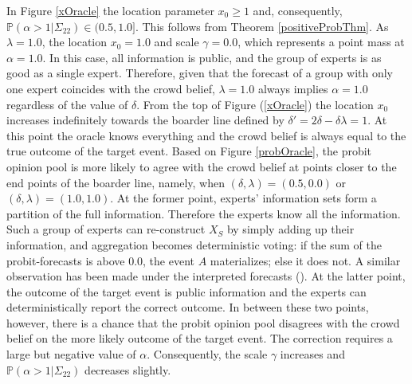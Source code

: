 \documentclass[11pt]{article}
\renewcommand{\P}{\mathbb{P}}
\theoremstyle{definition}
\theoremstyle{definition}
\begin{document}
In Figure \ref{xOracle} the location parameter $x_0 \geq 1$ and, consequently, $\P(\alpha > 1 | \Sigma_{22}) \in (0.5, 1.0]$. This follows from Theorem \ref{positiveProbThm}. As $\lambda = 1.0$, the location $x_0 = 1.0$ and scale $\gamma = 0.0$, which represents a point mass at $\alpha = 1.0$.  In this case, all information is public, and the group of experts is as good as a single expert. Therefore, given that the forecast of a group with only one expert coincides with the crowd belief, $\lambda = 1.0$ always implies $\alpha = 1.0$ regardless of the value of $\delta$. From the top of Figure (\ref{xOracle}) the location $x_0$ increases indefinitely towards the boarder line defined by $\delta' = 2\delta - \delta\lambda = 1$. At this point the oracle knows everything and the crowd belief is always equal to the true outcome of the target event. Based on Figure \ref{probOracle}, the probit opinion pool is more likely to agree with the crowd belief at points closer to the end points of the boarder line, namely, when $(\delta, \lambda) = (0.5, 0.0)$ or  $(\delta, \lambda) = (1.0, 1.0)$. At the former point, experts' information sets form a partition of the full information. Therefore the experts know all the information. Such a group of experts can re-construct $X_S$ by simply adding up their information, and aggregation becomes deterministic voting: if the sum of the probit-forecasts is above $0.0$, the event $A$ materializes; else it does not. A similar observation has been made under the interpreted forecasts (\cite{hong2009interpreted}). At the latter point, the outcome of the target event is public information and the experts can deterministically report the correct outcome. In between these two points, however, there is a chance that the probit opinion pool disagrees with the crowd belief on the more likely outcome of the target event. The correction requires a large but negative value of $\alpha$. Consequently, the scale $\gamma$ increases and $\P(\alpha > 1 | \Sigma_{22})$ decreases slightly. 







\end{document}
